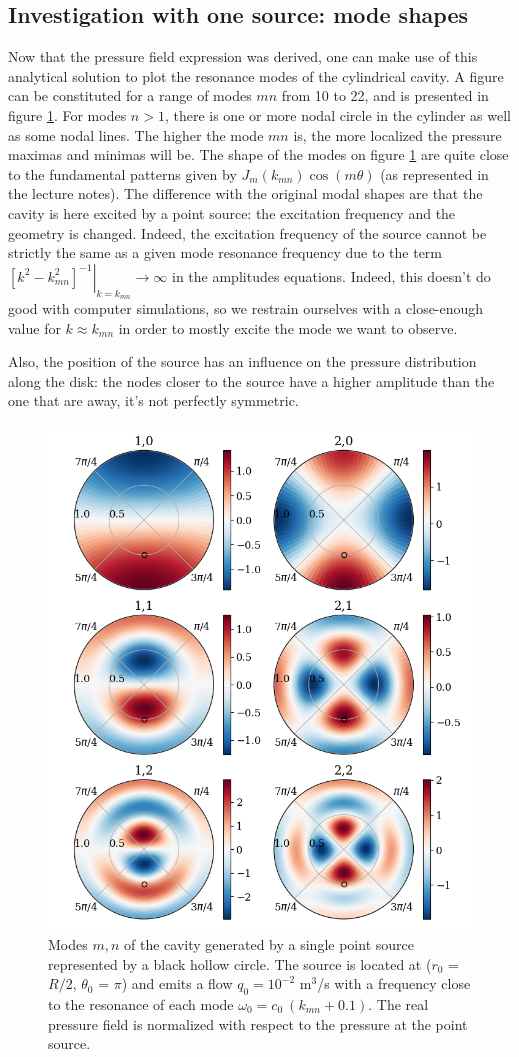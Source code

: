 \documentclass[%
 reprint,
 amsmath,amssymb,
 aps,
]{revtex4-2}
\begin{document}
\subsection{Investigation with one source: mode shapes}
Now that the pressure field expression was derived, one can make use of this analytical solution to plot the resonance modes of the cylindrical cavity. A figure can be constituted for a range of modes $mn$ from 10 to 22, and is presented in figure \ref{fig:modes}. For modes $n>1$, there is one or more nodal circle in the cylinder as well as some nodal lines. The higher the mode $mn$ is, the more localized the pressure maximas and minimas will be. The shape of the modes on figure \ref{fig:modes} are quite close to the fundamental patterns given by $J_m(k_{mn})\cos(m\theta)$ (as represented in the lecture notes). The difference with the original modal shapes are that the cavity is here excited by a point source: the excitation frequency and the geometry is changed. Indeed, the excitation frequency of the source cannot be strictly the same as a given mode resonance frequency due to the term $\left.\left[k^2 - k^2_{mn}\right]^{-1}\right|_{k = k_{mn}} \longrightarrow \infty$ in the amplitudes equations. Indeed, this doesn't do good with computer simulations, so we restrain ourselves with a close-enough value for $k \approx k_{mn}$ in order to mostly excite the mode we want to observe.

Also, the position of the source has an influence on the pressure distribution along the disk: the nodes closer to the source have a higher amplitude than the one that are away, it's not perfectly symmetric. 

\begin{figure}
    \centering
    \includegraphics[width=.5\textwidth]{figures/modes.png}
    \caption{Modes $m,n$ of the cavity generated by a single point source represented by a black hollow circle. The source is located at ($r_0$ = $R/2$, $\theta_0$ = $\pi$) and emits a flow $q_0 = 10^{-2}$ m$^3$/s with a frequency close to the resonance of each mode $\omega_0 = c_0 \: (k_{mn} + 0.1)$. The real pressure field is normalized with respect to the pressure at the point source.}
    \label{fig:modes}
\end{figure}
\end{document}
